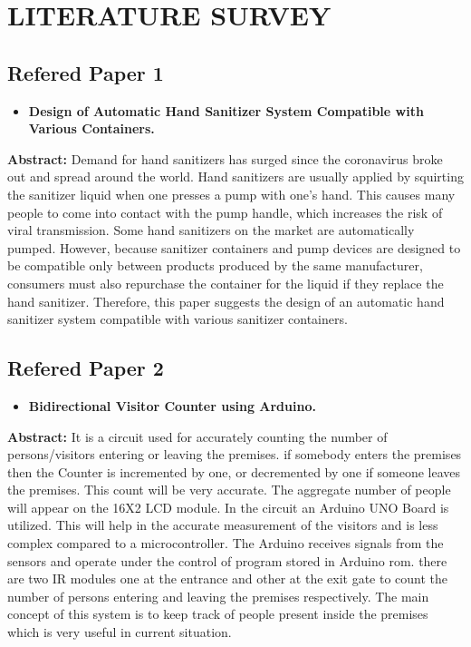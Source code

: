  
 \chapter{LITERATURE SURVEY}
 
 \section{Refered Paper 1}
 \begin{itemize}
 	\item  \Large\textbf {Design of Automatic Hand Sanitizer System Compatible with Various Containers.}
 \end{itemize}
 { \Large \textbf{Abstract:}}
 Demand for hand sanitizers has surged since the coronavirus broke out and spread around the world. Hand sanitizers are usually applied by squirting the sanitizer liquid when one presses a pump with one’s hand. This causes many people to come into contact with the pump handle, which increases the risk of viral transmission. Some hand sanitizers on the market are automatically pumped. However, because sanitizer containers and pump devices are designed to be compatible only between products produced by the same manufacturer, consumers must also repurchase the container for the liquid if they replace the hand sanitizer. Therefore, this paper suggests the design of an automatic hand sanitizer system compatible with various sanitizer containers.

 
 
  \newpage
 \section{Refered Paper 2}
 \begin{itemize}
 	\item  \Large\textbf{Bidirectional Visitor Counter using Arduino.}
 	
 \end{itemize}
 
 { \Large \textbf{Abstract:}}
 It is a circuit used for accurately counting the number of persons/visitors entering or leaving the premises. if somebody enters the premises then the Counter is incremented by one, or decremented by one if someone leaves the premises. This count will be very accurate. The aggregate number of people will appear on the 16X2 LCD module. In the circuit an Arduino UNO Board is utilized. This will help in the accurate measurement of the visitors and is less complex compared to a microcontroller. The Arduino receives signals from the sensors and operate under the control of program stored in Arduino rom. there are two IR modules one at the entrance and other at the exit gate to count the number of persons entering and leaving the premises respectively. The main concept of this system is to keep track of people present inside the premises which is very useful in current situation.
 

